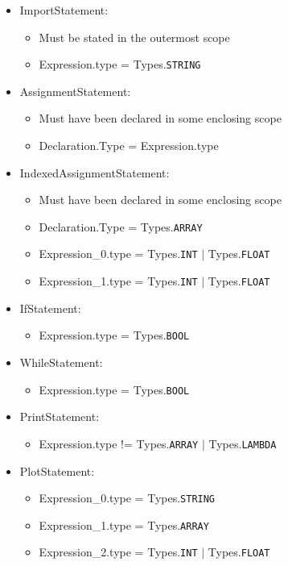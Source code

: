 \begin{itemize}
	\item ImportStatement:
		\begin{itemize}
			\item Must be stated in the outermost scope
			\item Expression.type = Types.\texttt{STRING}
		\end{itemize}
	\item AssignmentStatement:
		\begin{itemize}
			\item Must have been declared in some enclosing scope
			\item Declaration.Type = Expression.type
		\end{itemize}
	\item IndexedAssignmentStatement:
		\begin{itemize}
			\item Must have been declared in some enclosing scope
			\item Declaration.Type = Types.\texttt{ARRAY}
			\item Expression\_0.type = Types.\texttt{INT} $|$ Types.\texttt{FLOAT}
			\item Expression\_1.type = Types.\texttt{INT} $|$ Types.\texttt{FLOAT}
		\end{itemize}
	\item IfStatement:
		\begin{itemize}
			\item Expression.type = Types.\texttt{BOOL}
		\end{itemize}
	\item WhileStatement:
		\begin{itemize}
			\item Expression.type = Types.\texttt{BOOL}
		\end{itemize}
	\item PrintStatement:
		\begin{itemize}
			\item Expression.type != Types.\texttt{ARRAY} $|$ Types.\texttt{LAMBDA}
		\end{itemize}
	\item PlotStatement:
		\begin{itemize}
			\item Expression\_0.type = Types.\texttt{STRING}
			\item Expression\_1.type = Types.\texttt{ARRAY}
			\item Expression\_2.type = Types.\texttt{INT} $|$ Types.\texttt{FLOAT}

\end{itemize}
\end{itemize}
